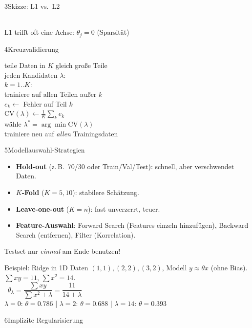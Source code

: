 \begin{hngrid}
\begin{hnp}[raster multicolumn=2,acc=hnteal]{3}{Skizze: L1 vs.\ L2}
\begin{tikzpicture}[>=Stealth,scale=.75]
\end{tikzpicture}\\[-2pt]
{\tiny L1 trifft oft eine Achse: $\theta_j=0$ (Sparsität)}
\end{hnp}
%
\begin{hnp}[raster multicolumn=3,acc=hnnavy]{4}{Kreuzvalidierung}
\begin{pcode}
teile Daten in $K$ gleich große Teile\\
 jeden Kandidaten $\lambda$:\\
\hii {} $k=1..K$:\\
\hiii trainiere auf allen Teilen außer $k$\\
\hiii $e_k\leftarrow$ Fehler auf Teil $k$\\
\hii $\mathrm{CV}(\lambda)\leftarrow\frac1K\sum_ke_k$\\
wähle $\lambda^*=\arg\min\mathrm{CV}(\lambda)$\\
trainiere neu auf \emph{allen} Trainingsdaten
\end{pcode}
\end{hnp}
%
\begin{hnp}[raster multicolumn=3,acc=hngreen]{5}{Modellauswahl-Strategien}
\begin{itemize}
\item \textbf{Hold-out} (z.\,B.\ 70/30 oder Train/Val/Test): schnell, aber verschwendet Daten.
\item \textbf{$K$-Fold} ($K{=}5,10$): stabilere Schätzung.
\item \textbf{Leave-one-out} ($K{=}n$): fast unverzerrt, teuer.
\item \textbf{Feature-Auswahl}: Forward Search (Features einzeln hinzufügen), Backward Search (entfernen), Filter (Korrelation).
\end{itemize}
Testset nur \emph{einmal} am Ende benutzen!
\end{hnp}
%
\begin{hnex}[raster multicolumn=3]{Beispiel: Ridge in 1D}
Daten $(1,1),(2,2),(3,2)$, Modell $y\approx\theta x$ (ohne Bias). $\sum xy=11$, $\sum x^2=14$.\\
\hnsol\ $\theta_\lambda=\dfrac{\sum xy}{\sum x^2+\lambda}=\dfrac{11}{14+\lambda}$\\
$\lambda=0$: $\theta=0.786$ \;|\; $\lambda=2$: $\theta=0.688$ \;|\; $\lambda=14$: $\theta=0.393$\\
\end{hnex}
%
\begin{hnp}[raster multicolumn=3,acc=hnrose]{6}{Implizite Regularisierung}

\end{hnp}
\end{hngrid}
